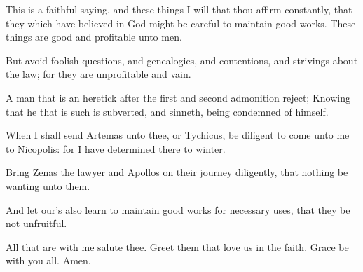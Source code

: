 \verse This is a faithful saying, and these things I will that thou affirm constantly, that they which have believed in God might be careful to maintain good works. These things are good and profitable unto men.

\verse But avoid foolish questions, and genealogies, and contentions, and strivings about the law; for they are unprofitable and vain.

\verse A man that is an heretick after the first and second admonition reject; \verse Knowing that he that is such is subverted, and sinneth, being condemned of himself.

\verse When I shall send Artemas unto thee, or Tychicus, be diligent to come unto me to Nicopolis: for I have determined there to winter.

\verse Bring Zenas the lawyer and Apollos on their journey diligently, that nothing be wanting unto them.

\verse And let our's also learn to maintain good works for necessary uses, that they be not unfruitful.

\verse All that are with me salute thee. Greet them that love us in the faith. Grace be with you all. Amen.

